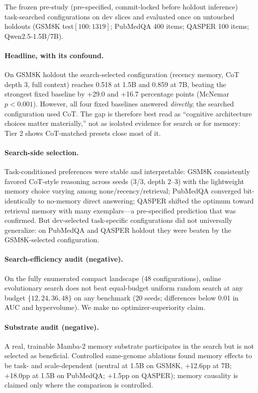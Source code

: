\documentclass[11pt]{article}
\begin{document}
The frozen pre-study (pre-specified, commit-locked before holdout
inference) task-searched configurations on dev slices and evaluated once on
untouched holdouts (GSM8K test$[100{:}1319]$; PubMedQA 400 items; QASPER
100 items; Qwen2.5-1.5B/7B).

\paragraph{Headline, with its confound.} On GSM8K holdout the
search-selected configuration (recency memory, CoT depth 3, full context)
reaches 0.518 at 1.5B and 0.859 at 7B, beating the strongest fixed baseline
by +29.0 and +16.7 percentage points (McNemar $p{<}0.001$). However, all
four fixed baselines answered \emph{directly}; the searched configuration
used CoT. The gap is therefore best read as ``cognitive architecture
choices matter materially,'' not as isolated evidence for search or for
memory: Tier 2 shows CoT-matched presets close most of it.

\paragraph{Search-side selection.} Task-conditioned preferences were stable
and interpretable: GSM8K consistently favored CoT-style reasoning across
seeds (3/3, depth 2--3) with the lightweight memory choice varying among
none/recency/retrieval; PubMedQA converged bit-identically to no-memory
direct answering; QASPER shifted the optimum toward retrieval memory with
many exemplars---a pre-specified prediction that was confirmed. But
dev-selected task-specific configurations did not universally generalize:
on PubMedQA and QASPER holdout they were beaten by the GSM8K-selected
configuration.

\paragraph{Search-efficiency audit (negative).} On the fully enumerated
compact landscape (48 configurations), online evolutionary search does not
beat equal-budget uniform random search at any budget $\{12, 24, 36, 48\}$
on any benchmark (20 seeds; differences below 0.01 in AUC and hypervolume).
We make no optimizer-superiority claim.

\paragraph{Substrate audit (negative).} A real, trainable Mamba-2 memory
substrate participates in the search but is not selected as beneficial.
Controlled same-genome ablations found memory effects to be task- and
scale-dependent (neutral at 1.5B on GSM8K, +12.6pp at 7B; +18.0pp at 1.5B
on PubMedQA; +1.5pp on QASPER); memory causality is claimed only where the
comparison is controlled.
\end{document}
